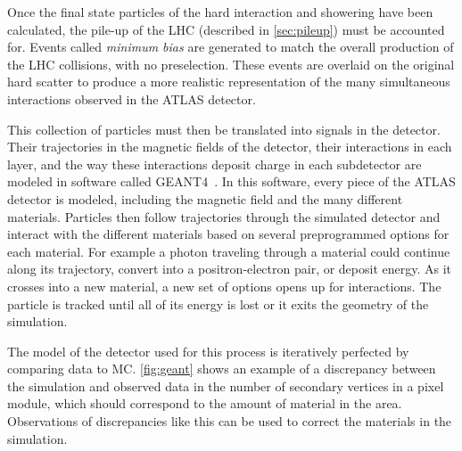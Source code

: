 Once the final state particles of the hard interaction and showering have been calculated, the pile-up of the \ac{LHC} (described in \autoref{sec:pileup}) must be accounted for. Events called \textit{minimum bias} are generated to match the overall production of the \ac{LHC} collisions, with no preselection. These events are overlaid on the original hard scatter to produce a more realistic representation of the many simultaneous interactions observed in the ATLAS detector.

This collection of particles must then be translated into signals in the detector. Their trajectories in the magnetic fields of the detector, their interactions in each layer, and the way these interactions deposit charge in each subdetector are modeled in software called {\sc GEANT4}~\cite{Agostinelli:2002hh}. In this software, every piece of the ATLAS detector is modeled, including the magnetic field and the many different materials. Particles then follow trajectories through the simulated detector and interact with the different materials based on several preprogrammed options for each material. For example a photon traveling through a material could continue along its trajectory, convert into a positron-electron pair, or deposit energy. As it crosses into a new material, a new set of options opens up for interactions. The particle is tracked until all of its energy is lost or it exits the geometry of the simulation.

The model of the detector used for this process is iteratively perfected by comparing data to \ac{MC}. \autoref{fig:geant} shows an example of a discrepancy between the simulation and observed data in the number of secondary vertices in a pixel module, which should correspond to the amount of material in the area. Observations of discrepancies like this can be used to correct the materials in the simulation. 

